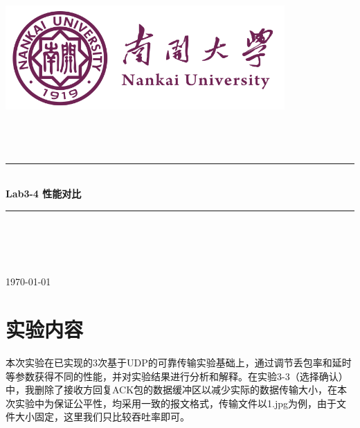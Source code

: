 \documentclass[UTF8,a4paper,10pt]{ctexart}
\newcommand{\HRule}{\rule{\linewidth}{0.5mm}}%
\begin{document}
\begin{titlepage}
    \begin{center}
    \includegraphics[width=0.8\textwidth]{NKU.png}\\[1cm]    
    \textsc{\Huge {} }\\[0.9cm]
    \textsc{\huge {}}\\[0.9cm]
    \textsc{\huge {}}\\[0.8cm]
    \HRule \\[0.9cm]
    { \LARGE \bfseries Lab3-4 性能对比}\\[0.4cm]
    \HRule \\[2.0cm]
    \centering
    \textsc{\LARGE {}}\\[0.5cm]
    \textsc{\LARGE {}}\\[0.5cm]
    \textsc{\LARGE {}}\\[0.5cm]
    \vfill
    {\Large \today}
    \end{center}
\end{titlepage}



\newpage
\tableofcontents
\setcounter{page}{1}

\vspace{1cm}

\section{实验内容}
本次实验在已实现的3次基于UDP的可靠传输实验基础上，通过调节丢包率和延时等参数获得不同的性能，并对实验结果进行分析和解释。在实验3-3（选择确认）中，我删除了接收方回复ACK包的数据缓冲区以减少实际的数据传输大小，在本次实验中为保证公平性，均采用一致的报文格式，传输文件以1.jpg为例，由于文件大小固定，这里我们只比较吞吐率即可。
\vspace{1cm}
\end{document}
